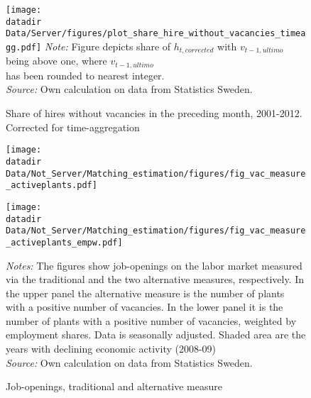 \begin{figure}[t]
\centering
\caption{Share of hires without vacancies in the preceding month, 2001-2012. \newline Corrected for time-aggregation}
\texttt{[image: \\datadir Data/Server/figures/plot\_share\_hire\_without\_vacancies\_timeagg.pdf]}
\flushleft
\footnotesize{\emph{Note:} Figure depicts share of $h_{t,corrected}$ with $v_{t-1,ultimo}$ being above one, where $v_{t-1,ultimo}$} \\
\footnotesize{ has been rounded to nearest integer. } \\
\footnotesize{\emph{Source:} Own calculation on data from Statistics Sweden.}
\label{fig:share_without_timeagg}
\end{figure}

\FloatBarrier


\begin{figure}[h]
\centering
\caption{Job-openings, traditional and alternative measure}
\texttt{[image: \\datadir Data/Not\_Server/Matching\_estimation/figures/fig\_vac\_measure\_activeplants.pdf]}
\begin{flushleft}
\end{flushleft}
\label{fig:openings_std_and_alt}
\vspace{0mm}
\centering
\texttt{[image: \\datadir Data/Not\_Server/Matching\_estimation/figures/fig\_vac\_measure\_activeplants\_empw.pdf]}
\begin{flushleft}
\footnotesize{\emph{Notes:} The figures show job-openings on the labor market measured via the traditional and the two alternative measures, respectively. In the upper panel the alternative measure is the number of plants with a positive number of vacancies. In the lower panel it is the number of plants with a positive number of vacancies, weighted by employment shares. Data is seasonally adjusted. Shaded area are the years with declining economic activity (2008-09)} \\
\footnotesize{\emph{Source:} Own calculation on data from Statistics Sweden.}
\end{flushleft}
\end{figure}


